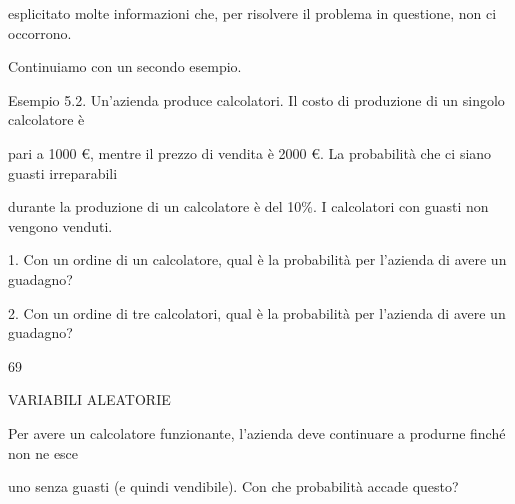 \documentclass[a4paper,portrait,12pt]{article}
\begin{document}
\begin{flushleft}
esplicitato molte informazioni che, per risolvere il problema in questione, non ci occorrono.
\end{flushleft}


\begin{flushleft}
Continuiamo con un secondo esempio.
\end{flushleft}


\begin{flushleft}
Esempio 5.2. Un'azienda produce calcolatori. Il costo di produzione di un singolo calcolatore \`{e}
\end{flushleft}


\begin{flushleft}
pari a 1000 \euro, mentre il prezzo di vendita \`{e} 2000 \euro. La probabilit\`{a} che ci siano guasti irreparabili
\end{flushleft}


\begin{flushleft}
durante la produzione di un calcolatore \`{e} del 10\%. I calcolatori con guasti non vengono venduti.
\end{flushleft}


\begin{flushleft}
1. Con un ordine di un calcolatore, qual \`{e} la probabilit\`{a} per l'azienda di avere un guadagno?
\end{flushleft}


\begin{flushleft}
2. Con un ordine di tre calcolatori, qual \`{e} la probabilit\`{a} per l'azienda di avere un guadagno?
\end{flushleft}


69










\begin{flushleft}
VARIABILI ALEATORIE
\end{flushleft}





\begin{flushleft}
Per avere un calcolatore funzionante, l'azienda deve continuare a produrne finch\'{e} non ne esce
\end{flushleft}


\begin{flushleft}
uno senza guasti (e quindi vendibile). Con che probabilit\`{a} accade questo?
\end{flushleft}
\end{document}
